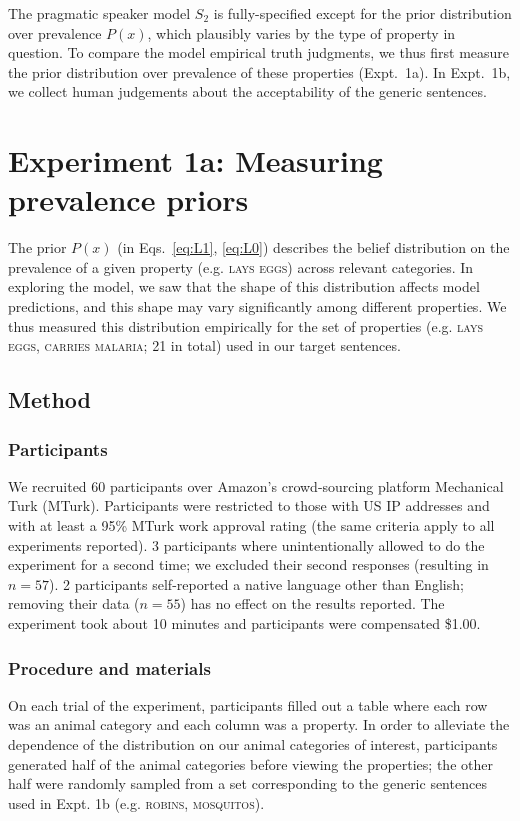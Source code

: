 \documentclass[12pt,letterpaper]{article}
\begin{document}
The pragmatic speaker model $S_2$ is fully-specified except for the prior distribution over prevalence $P(x)$, which plausibly varies by the type of property in question.
To compare the model empirical truth judgments, we thus first measure the prior distribution over prevalence of these properties (Expt.~1a).
In Expt.~1b, we collect human judgements about the acceptability of the generic sentences. 

\section*{Experiment 1a: Measuring prevalence priors}

The prior $P(x)$ (in Eqs.~\ref{eq:L1}, \ref{eq:L0}) describes the belief distribution on the prevalence of a given property (e.g. \textsc{lays eggs}) across relevant categories. 
In exploring the model, we saw that the shape of this distribution affects model predictions, and this shape may vary significantly among different properties.
We thus measured this distribution empirically for the set of properties (e.g. \textsc{lays eggs, carries malaria}; 21 in total) used in our target sentences. 
 
\subsection*{Method}

\subsubsection*{Participants}
We recruited 60 participants over Amazon's crowd-sourcing platform Mechanical Turk (MTurk).  
Participants were restricted to those with US IP addresses and with at least a 95\% MTurk work approval rating (the same criteria apply to all experiments reported). 
3 participants where unintentionally allowed to do the experiment for a second time; we excluded their second responses (resulting in $n=57$).
2 participants self-reported a native language other than English; removing their data ($n=55$) has no effect on the results reported. 
The experiment took about 10 minutes and participants were compensated \$1.00.

\subsubsection*{Procedure and materials}
On each trial of the experiment, participants filled out a table where each row was an animal category and each column was a property. 
In order to alleviate the dependence of the distribution on our animal categories of interest, participants generated half of the animal categories before viewing the properties; the other half were randomly sampled from a set corresponding to the generic sentences used in Expt. 1b (e.g. \textsc{robins, mosquitos}).
\end{document}

